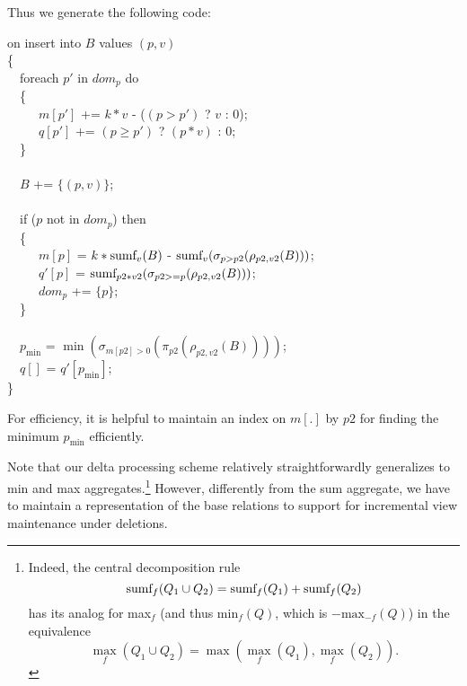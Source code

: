 \begin{example}
Thus we generate the following code:
\begin{tabbing}
on insert into $B$ values $(p, v)$ \\
\{ \\
~~foreach $p'$ in $dom_p$ do \\
~~\{ \\
~~~~~$m[p']$ += $k*v$ - ($(p > p')$ ? $v$ : $0$); \\
~~~~~$q[p']$ += $(p \ge p')$ ? $(p * v)$ : $0$;  \\
~~\} \\
\\
~~$B$ += $\{(p,v)\}$; \\
\\
~~if ($p$ not in $dom_p$) then \\
~~\{ \\
~~~~~$m[p]$ = $k * \mbox{sumf}_v(B)$
          - $\mbox{sumf}_v(\sigma_{p > p2}(\rho_{p2,v2}(B)))$; \\
~~~~~$q'[p]$ = $\mbox{sumf}_{p2 * v2}(\sigma_{p2 >= p}(\rho_{p2,v2}(B)))$; \\
~~~~~$dom_p$ += $\{p\}$; \\
~~\} \\
\\
~~$p_{\min}$ = $\min(\sigma_{m[p2] > 0}(\pi_{p2}(\rho_{p2,v2}(B))))$; \\
~~$q[]$ = $q'[p_{\min}]$; \\
\}
\end{tabbing}
For efficiency, it is helpful to maintain an index on $m[.]$ by $p2$
for finding the minimum $p_{\min}$ efficiently.
\end{example}


Note that our delta processing scheme relatively straightforwardly generalizes
to min and max aggregates.\footnote{Indeed, the central decomposition rule
\[
\mbox{sumf}_f(Q_1 \cup Q_2) = \mbox{sumf}_f(Q_1) + \mbox{sumf}_f(Q_2)
\]
has its analog for max$_f$ (and thus min$_f(Q)$, which is $-\mbox{max}_{-f}(Q)$) in
the equivalence
\[
\max_f(Q_1 \cup Q_2) = \max(\max_f(Q_1), \max_f(Q_2)).
\]
}
However, differently from the sum aggregate, we have to
maintain a representation of the base relations to support for incremental view
maintenance under deletions. 





